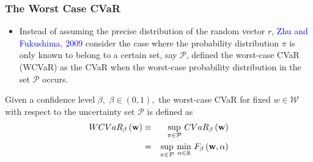 \documentclass[pdf,10pt,xcolor=dvipsnames,hide notes]{beamer}
\begin{document}
%
%	
%	
%	
%	
%	
%	
%	
%	
%
%	
%

\begin{frame}[label=frame2d]
	\frametitle{The Worst Case CVaR}
	
	\begin{itemize}
		\justifying

\item Instead of assuming the precise distribution of the random vector $r$,
\textcolor{blue}{Zhu and Fukushima}, \textcolor{blue}{2009} consider the case where the probability distribution $\pi$
is only known to belong to a certain set, say $\mathcal{P}$, defined the
worst-case CVaR (WCVaR) as the CVaR when the worst-case probability
distribution in the set $\mathcal{P}$ occurs.

\end{itemize}

\begin{definition}
	Given a confidence level $\beta ,$ $\beta \in (0,1),$ the worst-case CVaR
	for fixed $w\in \mathcal{W}$ with respect to the uncertainty set $\mathcal{P}
	$ is defined as
	\begin{eqnarray}
	WCVaR_{\beta }\left( \mathbf{w}\right) &\equiv &\underset{\pi \in \mathcal{P}%
	}{\sup }~ CVaR_{\beta }\left( \mathbf{w}\right)  \notag \\
	&=&\underset{\pi \in \mathcal{P}}{\sup }~\underset{\alpha \in
		\mathbb{R}
	}{\min }~F_{\beta }\left(\mathbf{w},\alpha \right)  \label{14}
	\end{eqnarray}
\end{definition}

\end{frame}
\end{document}
